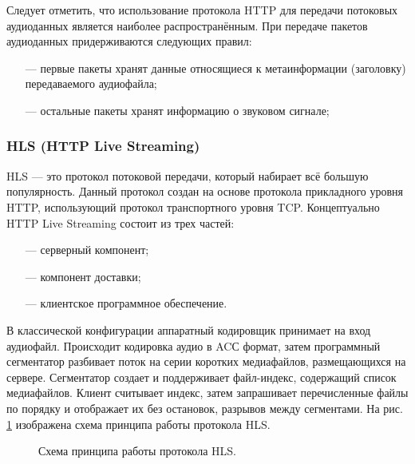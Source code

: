 	Следует отметить, что использование протокола HTTP для передачи потоковых аудиоданных является наиболее распространённым.
	При передаче пакетов аудиоданных придерживаются следующих правил:
	\begin{itemize}[leftmargin=1.6\parindent]
		\item[---] первые пакеты хранят данные относящиеся к метаинформации (заголовку) передаваемого аудиофайла;
		\item[---] остальные пакеты хранят информацию о звуковом сигнале;
	\end{itemize}
	
	\subsubsection{HLS (HTTP Live Streaming)}

		\par HLS --- это протокол потоковой передачи, который набирает всё большую популярность. 
		Данный протокол создан на основе протокола прикладного уровня HTTP, использующий протокол транспортного уровня TCP.
		Концептуально HTTP Live Streaming состоит из трех частей:
		\begin{itemize}[leftmargin=1.6\parindent]
			\item[---] серверный компонент;
			\item[---] компонент доставки;
			\item[---] клиентское программное обеспечение.
		\end{itemize}

		\par В классической конфигурации аппаратный кодировщик принимает на вход аудиофайл. 
		Происходит кодировка аудио в ACС формат, 
		затем программный сегментатор разбивает поток на серии коротких медиафайлов, размещающихся на сервере. 
		Сегментатор создает и поддерживает файл-индекс, содержащий список медиафайлов. 
		Клиент считывает индекс, затем запрашивает перечисленные файлы по порядку и отображает их без остановок, разрывов между сегментами.
		На рис. \ref{fig:hls} изображена схема принципа работы протокола HLS.

		\begin{figure}[!h]
			\caption{Схема принципа работы протокола HLS.}
			\label{fig:hls}
		\end{figure}

